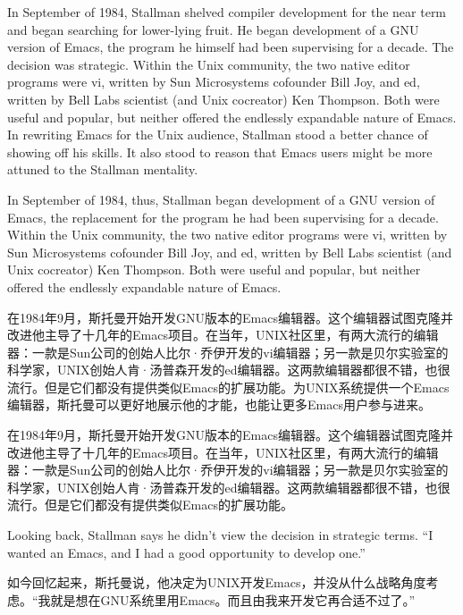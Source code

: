 \ifdefined\eng
\ifdefined\vone
In September of 1984, Stallman shelved compiler development for the near term and began searching for lower-lying fruit. He began development of a GNU version of Emacs, the program he himself had been supervising for a decade. The decision was strategic. Within the Unix community, the two native editor programs were vi, written by Sun Microsystems cofounder Bill Joy, and ed, written by Bell Labs scientist (and Unix cocreator) Ken Thompson. Both were useful and popular, but neither offered the endlessly expandable nature of Emacs. In rewriting Emacs for the Unix audience, Stallman stood a better chance of showing off his skills. It also stood to reason that Emacs users might be more attuned to the Stallman mentality.
\fi

\ifdefined\vtwo
In September of 1984, thus, Stallman began development of a GNU version of Emacs, the replacement for the program he had been supervising for a decade. Within the Unix community, the two native editor programs were vi, written by Sun Microsystems cofounder Bill Joy, and ed, written by Bell Labs scientist (and Unix cocreator) Ken Thompson. Both were useful and popular, but neither offered the endlessly expandable nature of Emacs.
\fi
\fi

\ifdefined\chs
\ifdefined\vone
在1984年9月，斯托曼开始开发GNU版本的Emacs编辑器。这个编辑器试图克隆并改进他主导了十几年的Emacs项目。在当年，UNIX社区里，有两大流行的编辑器：一款是Sun公司的创始人比尔·乔伊开发的vi编辑器；另一款是贝尔实验室的科学家，UNIX创始人肯·汤普森开发的ed编辑器。这两款编辑器都很不错，也很流行。但是它们都没有提供类似Emacs的扩展功能。为UNIX系统提供一个Emacs编辑器，斯托曼可以更好地展示他的才能，也能让更多Emacs用户参与进来。
\fi

\ifdefined\vtwo
在1984年9月，斯托曼开始开发GNU版本的Emacs编辑器。这个编辑器试图克隆并改进他主导了十几年的Emacs项目。在当年，UNIX社区里，有两大流行的编辑器：一款是Sun公司的创始人比尔·乔伊开发的vi编辑器；另一款是贝尔实验室的科学家，UNIX创始人肯·汤普森开发的ed编辑器。这两款编辑器都很不错，也很流行。但是它们都没有提供类似Emacs的扩展功能。
\fi
\fi

\ifdefined\eng
Looking back, Stallman says he didn't view the decision in strategic terms. ``I wanted an Emacs, and I had a good opportunity to develop one.''
\fi

\ifdefined\chs
如今回忆起来，斯托曼说，他决定为UNIX开发Emacs，并没从什么战略角度考虑。``我就是想在GNU系统里用Emacs。而且由我来开发它再合适不过了。''
\fi

